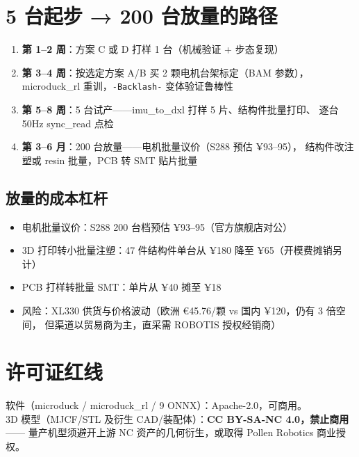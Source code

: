 \documentclass[11pt,a4paper]{ctexart}
\begin{document}
\section{5 台起步 → 200 台放量的路径}

\begin{enumerate}\itemsep2pt
\item \textbf{第 1--2 周}：方案 C 或 D 打样 1 台（机械验证 + 步态复现）
\item \textbf{第 3--4 周}：按选定方案 A/B 买 2 颗电机台架标定（BAM 参数），
  microduck\_rl 重训，\texttt{-Backlash-} 变体验证鲁棒性
\item \textbf{第 5--8 周}：5 台试产——imu\_to\_dxl 打样 5 片、结构件批量打印、
  逐台 50Hz sync\_read 点检
\item \textbf{第 3--6 月}：200 台放量——电机批量议价（S288 预估 ¥93--95），
  结构件改注塑或 resin 批量，PCB 转 SMT 贴片批量
\end{enumerate}

\subsection{放量的成本杠杆}
\begin{itemize}\itemsep0pt
\item 电机批量议价：S288 200 台档预估 ¥93--95（官方旗舰店对公）
\item 3D 打印转小批量注塑：47 件结构件单台从 ¥180 降至 ¥65（开模费摊销另计）
\item PCB 打样转批量 SMT：单片从 ¥40 摊至 ¥18
\item 风险：XL330 供货与价格波动（欧洲 €45.76/颗 vs 国内 ¥120，仍有 3 倍空间，
  但渠道以贸易商为主，直采需 ROBOTIS 授权经销商）
\end{itemize}

\section{许可证红线}
软件（microduck / microduck\_rl / 9 ONNX）：Apache-2.0，可商用。\\
3D 模型（MJCF/STL 及衍生 CAD/装配体）：\textbf{CC BY-SA-NC 4.0，禁止商用}——
量产机型须避开上游 NC 资产的几何衍生，或取得 Pollen Robotics 商业授权。
\end{document}

